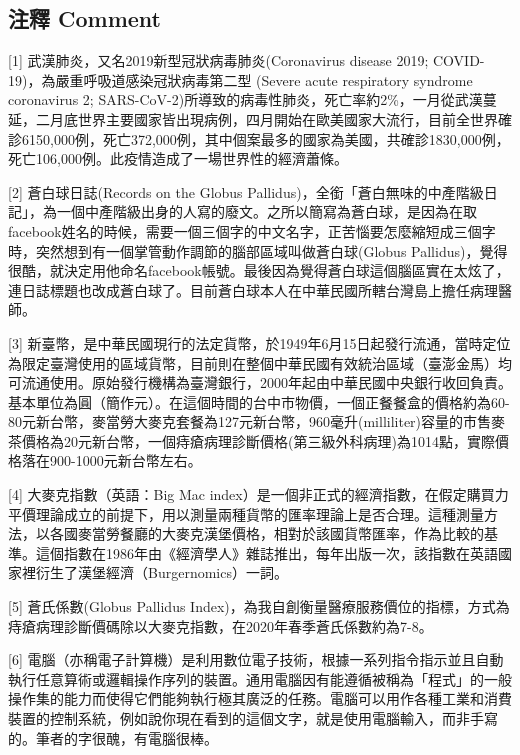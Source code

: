 \documentclass[a5paper, 11pt
]{book}
\begin{document}
\hypertarget{ux6ce8ux91cb-comment}{%
\subsection{注釋 Comment}\label{ux6ce8ux91cb-comment}}

{[}1{]} 武漢肺炎，又名2019新型冠狀病毒肺炎(Coronavirus disease 2019;
COVID-19)，為嚴重呼吸道感染冠狀病毒第二型 (Severe acute respiratory
syndrome coronavirus 2;
SARS-CoV-2)所導致的病毒性肺炎，死亡率約2\%，一月從武漢蔓延，二月底世界主要國家皆出現病例，四月開始在歐美國家大流行，目前全世界確診6150,000例，死亡372,000例，其中個案最多的國家為美國，共確診1830,000例，死亡106,000例。此疫情造成了一場世界性的經濟蕭條。

{[}2{]} 蒼白球日誌(Records on the Globus
Pallidus)，全銜「蒼白無味的中產階級日記」，為一個中產階級出身的人寫的廢文。之所以簡寫為蒼白球，是因為在取facebook姓名的時候，需要一個三個字的中文名字，正苦惱要怎麼縮短成三個字時，突然想到有一個掌管動作調節的腦部區域叫做蒼白球(Globus
Pallidus)，覺得很酷，就決定用他命名facebook帳號。最後因為覺得蒼白球這個腦區實在太炫了，連日誌標題也改成蒼白球了。目前蒼白球本人在中華民國所轄台灣島上擔任病理醫師。

{[}3{]}
新臺幣，是中華民國現行的法定貨幣，於1949年6月15日起發行流通，當時定位為限定臺灣使用的區域貨幣，目前則在整個中華民國有效統治區域（臺澎金馬）均可流通使用。原始發行機構為臺灣銀行，2000年起由中華民國中央銀行收回負責。基本單位為圓（簡作元）。在這個時間的台中市物價，一個正餐餐盒的價格約為60-80元新台幣，麥當勞大麥克套餐為127元新台幣，960毫升(milliliter)容量的市售麥茶價格為20元新台幣，一個痔瘡病理診斷價格(第三級外科病理)為1014點，實際價格落在900-1000元新台幣左右。

{[}4{]} 大麥克指數（英語：Big Mac
index）是一個非正式的經濟指數，在假定購買力平價理論成立的前提下，用以測量兩種貨幣的匯率理論上是否合理。這種測量方法，以各國麥當勞餐廳的大麥克漢堡價格，相對於該國貨幣匯率，作為比較的基準。這個指數在1986年由《經濟學人》雜誌推出，每年出版一次，該指數在英語國家裡衍生了漢堡經濟（Burgernomics）一詞。

{[}5{]} 蒼氏係數(Globus Pallidus
Index)，為我自創衡量醫療服務價位的指標，方式為痔瘡病理診斷價碼除以大麥克指數，在2020年春季蒼氏係數約為7-8。

{[}6{]}
電腦（亦稱電子計算機）是利用數位電子技術，根據一系列指令指示並且自動執行任意算術或邏輯操作序列的裝置。通用電腦因有能遵循被稱為「程式」的一般操作集的能力而使得它們能夠執行極其廣泛的任務。電腦可以用作各種工業和消費裝置的控制系統，例如說你現在看到的這個文字，就是使用電腦輸入，而非手寫的。筆者的字很醜，有電腦很棒。
\end{document}
